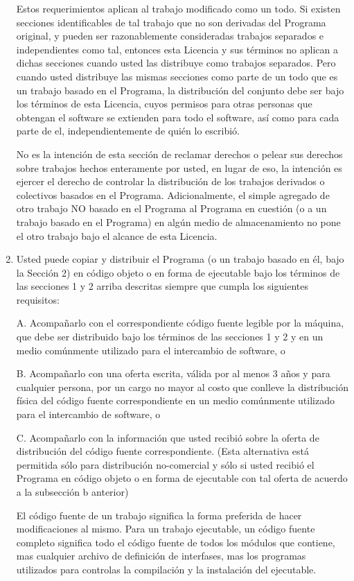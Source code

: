 \begin{enumerate}
Estos requerimientos aplican al trabajo modificado como un todo. Si existen secciones identificables de tal trabajo que no son derivadas del Programa original, y pueden ser razonablemente consideradas trabajos separados e independientes como tal, entonces esta Licencia y sus términos no aplican a dichas secciones cuando usted las distribuye como trabajos separados. Pero cuando usted distribuye las mismas secciones como parte de un todo que es un trabajo basado en el Programa, la distribución del conjunto debe ser bajo los términos de esta Licencia, cuyos permisos para otras personas que obtengan el software se extienden para todo el software, así como para cada parte de el, independientemente de quién lo escribió. 

No es la intención de esta sección de reclamar derechos o pelear sus derechos sobre trabajos hechos enteramente por usted, en lugar de eso, la intención es ejercer el derecho de controlar la distribución de los trabajos derivados o colectivos basados en el Programa. 
Adicionalmente, el simple agregado de otro trabajo NO basado en el Programa al Programa en cuestión (o a un trabajo basado en el Programa) en algún medio de almacenamiento no pone el otro trabajo bajo el alcance de esta Licencia. 

\item Usted puede copiar y distribuir el Programa (o un trabajo basado en él, bajo la Sección 2) en código objeto o en forma de ejecutable bajo los términos de las secciones 1 y 2 arriba descritas siempre que cumpla los siguientes requisitos: 

A. Acompañarlo con el correspondiente código fuente legible por la máquina, que debe ser distribuido bajo los términos de las secciones 1 y 2 y en un medio comúnmente utilizado para el intercambio de software, o 

B. Acompañarlo con una oferta escrita, válida por al menos 3 años y para cualquier persona, por un cargo no mayor al costo que conlleve la distribución física del código fuente correspondiente en un medio comúnmente utilizado para el intercambio de software, o 

C. Acompañarlo con la información que usted recibió sobre la oferta de distribución del código fuente correspondiente. (Esta alternativa está permitida sólo para distribución no-comercial y sólo si usted recibió el Programa en código objeto o en forma de ejecutable con tal oferta de acuerdo a la subsección b anterior) 

El código fuente de un trabajo significa la forma preferida de hacer modificaciones al mismo. Para un trabajo ejecutable, un código fuente completo significa todo el código fuente de todos los módulos que contiene, mas cualquier archivo de definición de interfases, mas los programas utilizados para controlas la compilación y la instalación del ejecutable. 


\end{enumerate}
